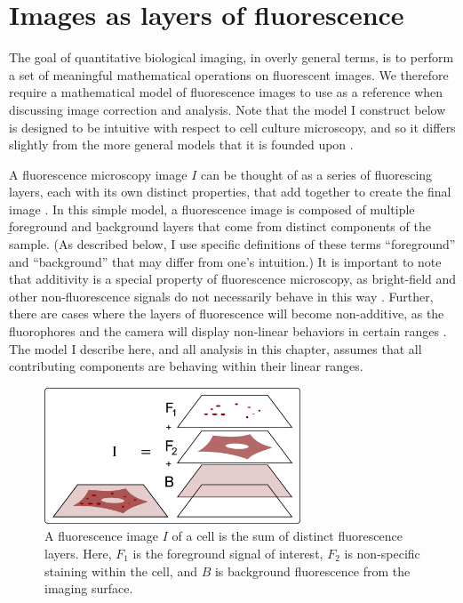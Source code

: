 \section{Images as layers of fluorescence}
\label{imaging:model}


The goal of quantitative biological imaging, in overly general terms, is to perform
a set of meaningful mathematical operations on fluorescent images.
We therefore require a mathematical model of fluorescence images
to use as a reference when discussing image correction and analysis.
Note that the model I construct below is designed
to be intuitive with respect to cell culture microscopy,
and so it differs slightly from the
more general models that it is founded upon
\cite{Schultz1974,Madiset1998,L2000,Model2001}.


A fluorescence microscopy image $I$ can be thought of as
a series of fluorescing layers, each with its own distinct properties,
that add together to create the final image .
In this simple model, a fluorescence image is composed of multiple
\b{foreground} and \b{background} layers that come 
from distinct components of the sample.
(As described below, I use specific
definitions of these terms ``foreground'' and ``background''
that may differ from one's intuition.)
It is important to note that additivity is a special property
of fluorescence microscopy, as bright-field and other non-fluorescence signals do
not necessarily behave in this way \cite{L2000}.
Further, there are cases where the layers
of fluorescence will become non-additive,
as the fluorophores and the camera
will display non-linear behaviors in certain ranges \cite{Hiraoka1987}. 
The model I describe
here, and all analysis in this chapter, assumes that
all contributing components are behaving within their linear ranges.


  \begin{figure}[!bt]
  \centering
  \includegraphics[width=3in]{FIGS/imaging/layers.pdf}
  {\singlespacing 
  \caption[ Images as layers of fluorscence.]
            { A fluorescence image $I$ of a cell is the sum of
			distinct fluorescence layers. Here,
			$F_1$ is the foreground signal of interest, $F_2$
			is non-specific staining within the cell, and $B$
			is background fluorescence from the imaging surface.}
  \label{fig:imaging:layers}}
  \end{figure}

